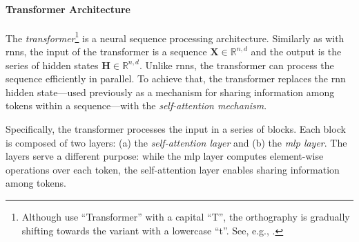 {\paragraph{Transformer Architecture} The \emph{transformer}\footnote{Although \citet{vaswani2017attention} use ``Transformer'' with a capital ``T'', the orthography is gradually shifting towards the variant with a lowercase ``t''. See, e.g., \citet[p.~215]{jurafsky2024}.} \cite{vaswani2017attention} is a neural sequence processing architecture. Similarly as with \acp{rnn}, the input of the transformer is a sequence $\mathbf{X} \in \mathbb{R}^{n,d}$ and the output is the series of hidden states $\mathbf{H} \in \mathbb{R}^{n,d}$. Unlike \acp{rnn}, the transformer can process the sequence efficiently in parallel. To achieve that, the transformer replaces the \ac{rnn} hidden state---used previously as a mechanism for sharing information among tokens within a sequence---with the \emph{self-attention mechanism}.

Specifically, the transformer processes the input in a series of blocks. Each block is composed of two layers: (a) the \emph{self-attention layer} and (b) the \emph{\ac{mlp} layer}. The layers serve a different purpose: while the \ac{mlp} layer computes element-wise operations over each token, the self-attention layer enables sharing information among tokens.

}
